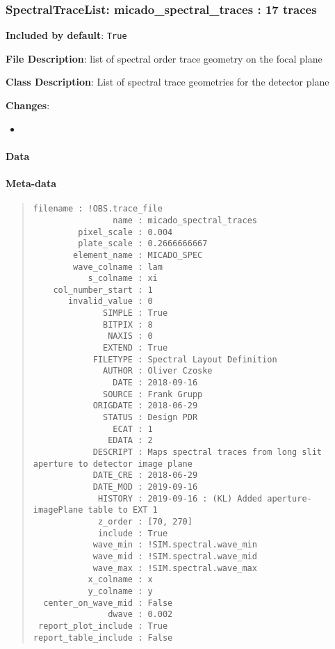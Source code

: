 \subsubsection{SpectralTraceList: \textquotedbl{}micado\_spectral\_traces\textquotedbl{} : 17 traces%
  \label{spectraltracelist-micado-spectral-traces-17-traces}%
}

\textbf{Included by default}: \texttt{True}

\textbf{File Description}: list of spectral order trace geometry on the focal plane

\textbf{Class Description}: List of spectral trace geometries for the detector plane

\textbf{Changes}:

\begin{itemize}
\item \end{itemize}


\paragraph{Data%
  \label{id3}%
}

\begin{figure}[H]
\noindent{}\label{fig-micado-spectral-traces}
\end{figure}


\paragraph{Meta-data%
  \label{id4}%
}

\begin{quote}
\begin{alltt}
\begin{lstlisting}[frame=single]
            filename : !OBS.trace_file
                name : micado_spectral_traces
         pixel_scale : 0.004
         plate_scale : 0.2666666667
        element_name : MICADO_SPEC
        wave_colname : lam
           s_colname : xi
    col_number_start : 1
       invalid_value : 0
              SIMPLE : True
              BITPIX : 8
               NAXIS : 0
              EXTEND : True
            FILETYPE : Spectral Layout Definition
              AUTHOR : Oliver Czoske
                DATE : 2018-09-16
              SOURCE : Frank Grupp
            ORIGDATE : 2018-06-29
              STATUS : Design PDR
                ECAT : 1
               EDATA : 2
            DESCRIPT : Maps spectral traces from long slit aperture to detector image plane
            DATE_CRE : 2018-06-29
            DATE_MOD : 2019-09-16
             HISTORY : 2019-09-16 : (KL) Added aperture-imagePlane table to EXT 1
             z_order : [70, 270]
             include : True
            wave_min : !SIM.spectral.wave_min
            wave_mid : !SIM.spectral.wave_mid
            wave_max : !SIM.spectral.wave_max
           x_colname : x
           y_colname : y
  center_on_wave_mid : False
               dwave : 0.002
 report_plot_include : True
report_table_include : False
\end{lstlisting}
\end{alltt}
\end{quote}
